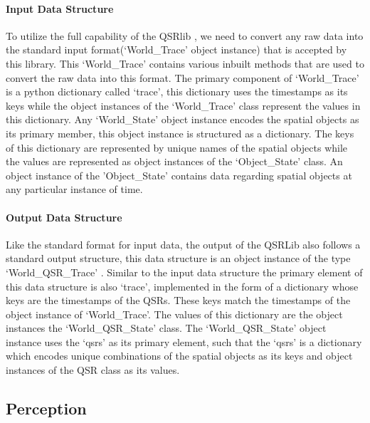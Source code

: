 \paragraph{Input Data Structure}To utilize the full capability of the QSRlib \cite{qsrlib}, we need to convert any raw data into the standard input format(`World\_Trace' object instance) that is accepted by this library. This `World\_Trace' \cite{qsrlib} contains various inbuilt methods that are used to convert the raw data into this format. The primary component of `World\_Trace' is a python dictionary called `trace', this dictionary uses the timestamps as its keys while the object instances of the `World\_Trace' class represent the values in this dictionary. Any `World\_State' object instance encodes the spatial objects as its primary member, this object instance is structured as a dictionary. The keys of this dictionary are represented by unique names of the spatial objects while the values are represented as object instances of the `Object\_State' \cite{qsrlib} class. An object instance of the 'Object\_State' contains data regarding spatial objects at any particular instance of time.

\paragraph{Output Data Structure}Like the standard format for input data, the output of the QSRLib also follows a standard output structure, this data structure is an object instance of the type `World\_QSR\_Trace' \cite{qsrlib}. Similar to the input data structure the primary element of this data structure is also `trace', implemented in the form of a dictionary whose keys are the timestamps of the QSRs. These keys match the timestamps of the object instance of `World\_Trace'. The values of this dictionary are the object instances the `World\_QSR\_State' class. The `World\_QSR\_State' object instance uses the `qsrs' as its primary element, such that the `qsrs' is a dictionary which encodes unique combinations of the spatial objects as its keys and object instances of the QSR class as its values.
\subsection{Perception}
